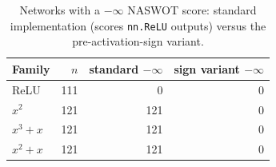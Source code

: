 \begin{table}[h]
\centering
\caption{Networks with a $-\infty$ NASWOT score: standard implementation (scores \texttt{nn.ReLU} outputs) versus the
  pre-activation-sign variant.}
\label{tab:naswot}
\small
\begin{tabular}{lrrr}
\toprule
\textbf{Family} & $n$ & \textbf{standard $-\infty$} & \textbf{sign variant $-\infty$} \\
\midrule
ReLU & 111 & 0 & 0 \\
$x^2$ & 121 & 121 & 0 \\
$x^3{+}x$ & 121 & 121 & 0 \\
$x^2{+}x$ & 121 & 121 & 0 \\
\bottomrule
\end{tabular}
\end{table}
